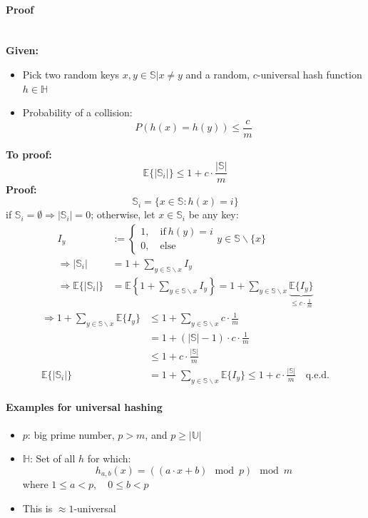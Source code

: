 \documentclass[12pt, a4paper]{scrartcl}
\renewcommand{\implies}{\Rightarrow}
\newcommand{\abs}[1]{|#1|}
\begin{document}
\paragraph{Proof}\mbox{}\\
\textbf{Given:}
\begin{itemize}
\item Pick two random keys $x,y\in\mathbb{S}|x\ne y$ and a random, $c$-universal hash function $h\in\mathbb{H}$
\item Probability of a collision:
  \[P(h(x)=h(y))\le \frac{c}{m}\]
\end{itemize}
\textbf{To proof:}
\[\mathbb{E}\{|\mathbb{S}_i|\}\le 1 + c\cdot\frac{|\mathbb{S}|}{m}\]
\textbf{Proof:}
\[\mathbb{S}_i=\{x\in\mathbb{S}:h(x)=i\}\]
if $\mathbb{S}_i=\emptyset\implies\abs{\mathbb{S}_i}=0$; otherwise, let $x\in\mathbb{S}_i$ be any key:
\begin{align*}
I_y&:=\left\{
  \begin{array}{l}
    1,\quad \mathrm{if\ } h(y)=i\\
    0,\quad \mathrm{else}
  \end{array}\right.
  y\in\mathbb{S}\backslash \{x\}\\
  \implies \abs{\mathbb{S}_i}&=1+\sum_{y\in\mathbb{S}\backslash x}I_y\\
  \implies \mathbb{E}\{\abs{\mathbb{S}_i}\}&=\mathbb{E}
  \left\{
  1+\sum_{y\in\mathbb{S}\backslash x}I_y
  \right\} = 1 + \sum_{y\in\mathbb{S}\backslash x} \underbrace{\mathbb{E}\{I_y\}}_{\le c\cdot\frac{1}{m}}
\end{align*}
\begin{align*}
  \implies 1 + \sum_{y\in\mathbb{S}\backslash x}\mathbb{E}\{I_y\}&\le 1+ \sum_{y\in\mathbb{S}\backslash x} c\cdot\frac{1}{m}\\
                                                                 &=1+(\abs{\mathbb{S}}-1)\cdot c\cdot\frac{1}{m}\\
                                                                 &\le 1+ c\cdot\frac{\abs{\mathbb{S}}}{m}\\
  \mathbb{E}\{\abs{\mathbb{S}_i}\}&=1+\sum_{y\in\mathbb{S}\backslash x}\mathbb{E}\{I_y\}
                                    \le 1+c\cdot\frac{\abs{\mathbb{S}}}{m}\quad \mathrm{q.e.d.}
\end{align*}

\paragraph{Examples for universal hashing}
\begin{itemize}
\item $p$: big prime number, $p>m$, and $p\ge\abs{\mathbb{U}}$
\item $\mathbb{H}$: Set of all $h$ for which:
  \[h_{a,b}(x)=((a\cdot x+b)\mod p) \mod m\]
  where $1\le a < p,\quad 0\le b < p$
\item This is $\approx 1$-universal %
\end{itemize}
\end{document}
